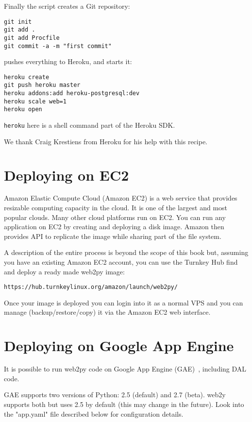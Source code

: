 \documentclass[justified,sixbynine,notoc]{tufte-book}
\def\ft{\small\tt}
\def\inxx#1{\index{#1}}
\begin{document}
\begin{fullwidth}
Finally the script creates a Git repository:

\begin{lstlisting}
git init
git add .
git add Procfile
git commit -a -m "first commit"
\end{lstlisting}
\noindent pushes everything to Heroku, and starts it:

\begin{lstlisting}
heroku create
git push heroku master
heroku addons:add heroku-postgresql:dev
heroku scale web=1
heroku open
\end{lstlisting}

{\ft heroku} here is a shell command part of the Heroku SDK.

We thank Craig Krestiens from Heroku for his help with this recipe.

\goodbreak\section{Deploying on EC2}

\inxx{Amazon EC2}

Amazon Elastic Compute Cloud (Amazon EC2) is a web service that provides resizable computing capacity in the cloud. It is one of the largest and most popular clouds. Many other cloud platforms run on EC2. You can run any application on EC2 by creating and deploying a disk image. Amazon then provides API to replicate the image while sharing part of the file system.

A description of the entire process is beyond the scope of this book but, assuming you have an existing Amazon EC2 account, you can use the Turnkey Hub find and deploy a ready made web2py image:

{\ft https://hub.turnkeylinux.org/amazon/launch/web2py/}

Once your image is deployed you can login into it as a normal VPS and you can manage (backup/restore/copy) it via the Amazon EC2 web interface.

\goodbreak\section{Deploying on Google App Engine}

\inxx{Google App Engine}

It is possible to run web2py code on Google App Engine (GAE)~\cite{gae}, including DAL code.

GAE supports two versions of Python: 2.5 (default) and 2.7 (beta). web2y supports both but uses 2.5 by default (this may change in the future). Look into the "app.yaml" file described below for configuration details.


\end{fullwidth}
\end{document}
